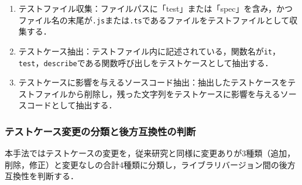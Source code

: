 \documentclass[submit]{ipsj}
\begin{document}
\begin{enumerate}
  \item テストファイル収集：ファイルパスに「test」または「spec」を含み，かつファイル名の末尾が{\verb|.js|}または{\verb|.ts|}であるファイルをテストファイルとして収集する．
  \item テストケース抽出：テストファイル内に記述されている，関数名が\verb|it|，\verb|test|，\verb|describe|である関数呼び出しをテストケースとして抽出する．
  \item テストケースに影響を与えるソースコード抽出：抽出したテストケースをテストファイルから削除し，残った文字列をテストケースに影響を与えるソースコードとして抽出する．
\end{enumerate}



\subsubsection{テストケース変更の分類と後方互換性の判断}
\label{sec:step1-2}

本手法ではテストケースの変更を，従来研究\cite{foo}と同様に変更ありが3種類（追加，削除，修正）と変更なしの合計4種類に分類し，ライブラリバージョン間の後方互換性を判断する．
\end{document}
